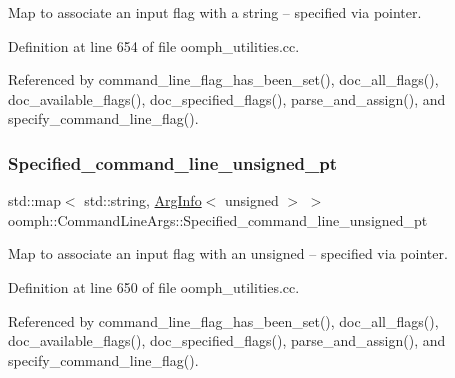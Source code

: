 Map to associate an input flag with a string -- specified via pointer. 



Definition at line 654 of file oomph\+\_\+utilities.\+cc.



Referenced by command\+\_\+line\+\_\+flag\+\_\+has\+\_\+been\+\_\+set(), doc\+\_\+all\+\_\+flags(), doc\+\_\+available\+\_\+flags(), doc\+\_\+specified\+\_\+flags(), parse\+\_\+and\+\_\+assign(), and specify\+\_\+command\+\_\+line\+\_\+flag().

\mbox{\label{namespaceoomph_1_1CommandLineArgs_ae489c2891e5e891242ed788b2a64d477}} 
\subsubsection{\texorpdfstring{Specified\+\_\+command\+\_\+line\+\_\+unsigned\+\_\+pt}{Specified\_command\_line\_unsigned\_pt}}
{\footnotesize\ttfamily std\+::map$<$ std\+::string, \hyperlink{structoomph_1_1CommandLineArgs_1_1ArgInfo}{Arg\+Info}$<$ unsigned $>$ $>$ oomph\+::\+Command\+Line\+Args\+::\+Specified\+\_\+command\+\_\+line\+\_\+unsigned\+\_\+pt}



Map to associate an input flag with an unsigned -- specified via pointer. 



Definition at line 650 of file oomph\+\_\+utilities.\+cc.



Referenced by command\+\_\+line\+\_\+flag\+\_\+has\+\_\+been\+\_\+set(), doc\+\_\+all\+\_\+flags(), doc\+\_\+available\+\_\+flags(), doc\+\_\+specified\+\_\+flags(), parse\+\_\+and\+\_\+assign(), and specify\+\_\+command\+\_\+line\+\_\+flag().

